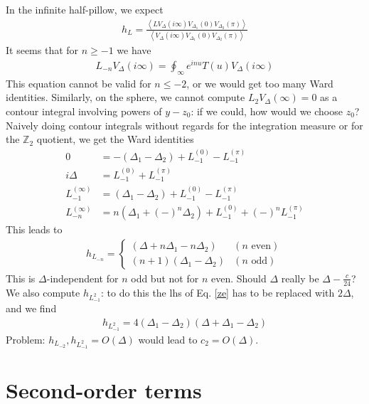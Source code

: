 \documentclass[12pt,a4paper]{article}
\begin{document}
In the infinite half-pillow, we expect
\begin{align}
 h_L = \frac{\left< LV_{\Delta}(i\infty)V_{\Delta_1}(0)V_{\Delta_2}(\pi)\right>}{\left< V_{\Delta}(i\infty)V_{\Delta_1}(0)V_{\Delta_2}(\pi)\right>}
\end{align}
It seems that for $n\geq -1$ we have 
\begin{align}
 L_{-n} V_\Delta(i\infty) = \oint_\infty e^{inu} T(u) V_\Delta(i\infty)
\end{align}
This equation cannot be valid for $n\leq -2$, or we would get too many Ward identities. Similarly, on the sphere, we cannot compute $L_2 V_\Delta(\infty) =0$ as a contour integral involving powers of $y-z_0$: if we could, how would we choose $z_0$? Naively doing contour integrals without regards for the integration measure or for the $\mathbb{Z}_2$ quotient, we get the Ward identities
\begin{align}
 0 &= -(\Delta_1-\Delta_2) + L_{-1}^{(0)} - L_{-1}^{(\pi)}
 \label{ze}
 \\
 i\Delta &= L_{-1}^{(0)} + L_{-1}^{(\pi)} 
 \\
 L_{-1}^{(\infty)} &= (\Delta_1-\Delta_2) + L_{-1}^{(0)} - L_{-1}^{(\pi)}
 \\
 L_{-n}^{(\infty)} &= n(\Delta_1+(-)^n\Delta_2) + L_{-1}^{(0)} +(-)^n L_{-1}^{(\pi)}
\end{align}
This leads to 
\begin{align}
 h_{L_{-n}} = \left\{\begin{array}{ll} (\Delta+n\Delta_1-n\Delta_2)  & (n \text{ even}) 
                      \\ (n+1)(\Delta_1-\Delta_2) & (n \text{ odd})
                     \end{array}\right.
\end{align}
This is $\Delta$-independent for $n$ odd but not for $n$ even. Should $\Delta$ really be $\Delta-\frac{c}{24}$? We also compute $h_{L_{-1}^2}$: to do this the lhs of Eq. \eqref{ze} has to be replaced with $2\Delta$, and we find 
\begin{align}
 h_{L_{-1}^2} = 4(\Delta_1-\Delta_2)(\Delta+\Delta_1-\Delta_2)
\end{align}
Problem: $h_{L_{-2}},h_{L_{-1}^2} = O(\Delta)$ would lead to $c_2 = O(\Delta)$. 

\section{Second-order terms}
\end{document}
